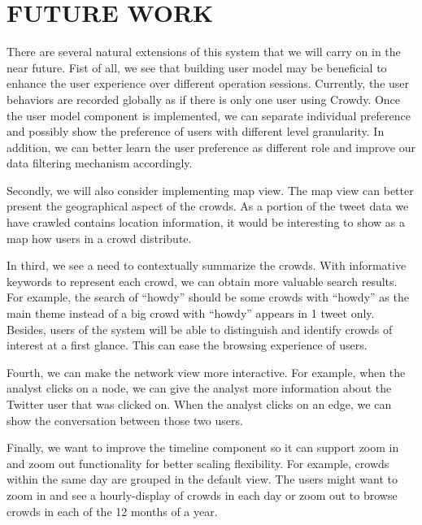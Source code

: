 \documentclass{sig-alternate}
\begin{document}
\section{FUTURE WORK}
There are several natural extensions of this system that we will carry on in the near future. Fist of all, we see that building user model may be beneficial to enhance the user experience over different operation sessions. Currently, the user behaviors are recorded globally as if there is only one user using Crowdy. Once the user model component is implemented, we can separate individual preference and possibly show the preference of users with different level granularity. In addition, we can better learn the user preference as different role and improve our data filtering mechanism accordingly.  

Secondly, we will also consider implementing map view. The map view can better present the geographical aspect of the crowds. As a portion of the tweet data we have crawled contains location information, it would be interesting to show as a map how users in a crowd distribute.

In third, we see a need to contextually summarize the crowds. With informative keywords to represent each crowd, we can obtain more valuable search results. For example, the search of ``howdy'' should be some crowds with ``howdy'' as the main theme instead of a big crowd with ``howdy'' appears in 1 tweet only. Besides, users of the system will be able to distinguish and identify crowds of interest at a first glance. This can ease the browsing experience of users.

Fourth, we can make the network view more interactive. For example, when the
analyst clicks on a node, we can give the analyst more information about the
Twitter user that was clicked on. When the analyst clicks on an edge, we can show the
conversation between those two users.

Finally, we want to improve the timeline component so it can support zoom in and zoom out functionality for better scaling flexibility. For example, crowds within the same day are grouped in the default view. The users might want to zoom in and see a hourly-display of crowds in each day or zoom out to browse crowds in each of the 12 months of a year.


 
\end{document}
